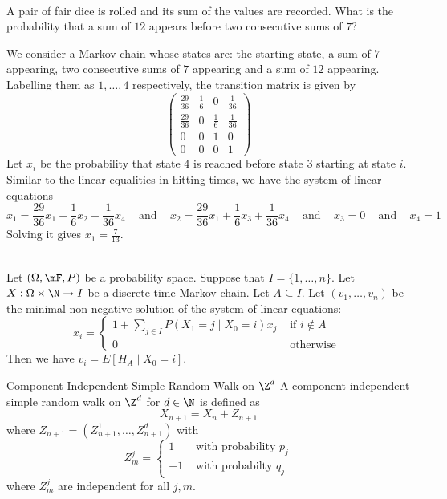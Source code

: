 \documentclass[a4paper]{article}
\begin{document}
\begin{eg}{}{}\\
A pair of fair dice is rolled and its sum of the values are recorded. What is the probability that a sum of $12$ appears before two consecutive sums of $7$?
\begin{answer}
We consider a Markov chain whose states are: the starting state, a sum of $7$ appearing, two consecutive sums of $7$ appearing and a sum of $12$ appearing. Labelling them as $1,\dots,4$ respectively, the transition matrix is given by $$\begin{pmatrix}
\frac{29}{36} & \frac{1}{6} & 0 & \frac{1}{36}\\
\frac{29}{36} & 0 & \frac{1}{6} & \frac{1}{36}\\
0 & 0 & 1 & 0\\
0 & 0 & 0 & 1
\end{pmatrix}$$
Let $x_i$ be the probability that state $4$ is reached before state $3$ starting at state $i$. Similar to the linear equalities in hitting times, we have the system of linear equations $$x_1=\frac{29}{36}x_1+\frac{1}{6}x_2+\frac{1}{36}x_4\;\;\;\text{ and }\;\;\;x_2=\frac{29}{36}x_1+\frac{1}{6}x_3+\frac{1}{36}x_4\;\;\;\text{ and }\;\;\;x_3=0\;\;\;\text{ and }\;\;\;x_4=1$$ Solving it gives $x_1=\frac{7}{13}$. 
\end{answer}
\end{eg}

\begin{prp}{}{}\\
Let $(\Omega,\mF,P)$ be a probability space. Suppose that $I=\{1,\dots,n\}$. Let $X:\Omega\times\N\to I$ be a discrete time Markov chain. Let $A\subseteq I$. Let $(v_1,\dots,v_n)$ be the minimal non-negative solution of the system of linear equations: $$x_i=\begin{cases}
1+\sum_{j\in I}P(X_1=j\;|\;X_0=i)x_j & \text{ if }i\notin A\\
0 & \text{ otherwise }
\end{cases}$$
Then we have $v_i=E[H_A\;|\;X_0=i]$. 
\end{prp}

\begin{defn}{Component Independent Simple Random Walk on $\Z^d$}{} A component independent simple random walk on $\Z^d$ for $d\in\N$ is defined as $$X_{n+1}=X_n+Z_{n+1}$$ where $Z_{n+1}=(Z_{n+1}^1,\dots,Z_{n+1}^d)$ with $$Z_m^j=\begin{cases}
1 & \text{ with probability }p_j\\
-1 & \text{ with probabilty }q_j
\end{cases}$$
where $Z_m^j$ are independent for all $j,m$. 
\end{defn}
\end{document}
